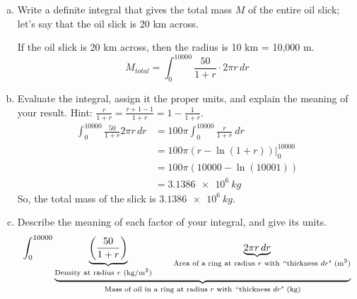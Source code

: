 \documentclass[12pt]{article}
\newenvironment{red}{\color{red}}{\ignorespacesafterend}
\begin{document}
\begin{enumerate}
\begin{enumerate}[(a)]
    \begin{red}
        \[\Delta M = \rho(r)\cdot \Delta A = \frac{50}{1+r}\cdot (2\pi r\Delta r) \]
    \end{red}
    \item Write a definite integral that gives the total mass \(M\) of the entire oil slick; let's say that the oil slick is 20 km across.

    \begin{red}
        If the oil slick is 20 km across, then the radius is 10 km = 10,000 m.
        \[M_{total} = \int_0^{10000} \frac{50}{1+r}\cdot 2\pi r\, dr\]
    \end{red}
    \item Evaluate the integral, assign it the proper units, and explain the meaning of your result. Hint: \(\frac{r}{1+r} = \frac{r+1-1}{1+r} = 1 - \frac{1}{1+r}\).
    \begin{red}
        \begin{align*} 
            \int_0^{10000} \frac{50}{1 + r} 2\pi r\, dr 
            & = 100\pi \int_0^{10000} \frac{r}{1 + r}\ dr \\ 
            &  = 100\pi (r - \ln(1 + r)) \bigg|_0^{10000}\\ 
            & = 100\pi(10000 - \ln(10001))\\ & = \SI{3.1386e6}{kg}
        \end{align*}
        So, the total mass of the slick is $\SI{3.1386e6}{kg}.$
    \end{red}
    \item Describe the meaning of each factor of your integral, and give its units.
    \begin{red}
        \[\int_0^{10000} \underbrace{ \underbrace{\left(\frac{50}{1 + r}\right)}_{\text{Density at radius \(r\) (kg/m\(^2\))}\quad } \underbrace{2\pi r\, dr}_{\quad \text{Area of a ring at radius \(r\) with}\ ``\text{thickness \(dr\)" (m\(^2\))} } }_{ \text{Mass of oil in a ring at radius \(r\) with}\ ``\text{thickness \(dr\)" (kg)} }\]
    \end{red}
\end{enumerate}


\end{enumerate}
\end{document}
